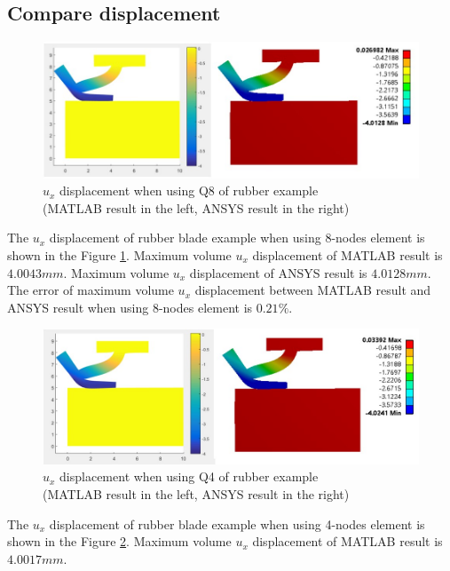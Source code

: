 \subsection{Compare displacement}

\begin{figure}[H]
    \centering
    \includegraphics[scale=0.7]{Figures/chapter5/r_q8_ux.jpg}
    \decoRule
    \caption{$u_x$ displacement when using Q8 of rubber example \\
    (MATLAB result in the left, ANSYS result in the right)}
    \label{fig:r_q8_ux}
\end{figure}
\noindent
The $u_x$ displacement of rubber blade example when using 8-nodes element is shown in the Figure \ref{fig:r_q8_ux}.
Maximum volume $u_x$ displacement of MATLAB result is $4.0043 mm$.
Maximum volume $u_x$ displacement of ANSYS result is $4.0128 mm$.
The error of maximum volume $u_x$ displacement between MATLAB result and ANSYS result when using 8-nodes element is $0.21\%$.
\newline
\begin{figure}[H]
    \centering
    \includegraphics[scale=0.65]{Figures/chapter5/r_q4_ux.jpg}
    \decoRule
    \caption{$u_x$ displacement when using Q4 of rubber example \\
    (MATLAB result in the left, ANSYS result in the right)}
    \label{fig:r_q4_ux}
\end{figure}
\noindent
The $u_x$ displacement of rubber blade example when using 4-nodes element is shown in the Figure \ref{fig:r_q4_ux}.
Maximum volume $u_x$ displacement of MATLAB result is $4.0017 mm$.
